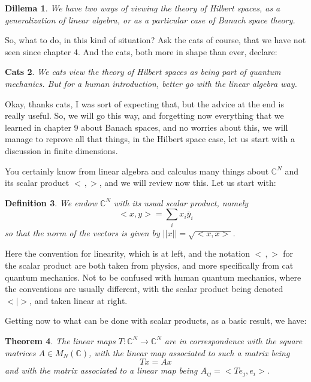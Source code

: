 \documentclass[12pt]{amsbook}
\newtheorem{theorem}{Theorem}[chapter]
\newtheorem{cats}[theorem]{Cats}
\newtheorem{definition}[theorem]{Definition}
\newtheorem{dillema}[theorem]{Dillema}
\begin{document}
\begin{dillema}
We have two ways of viewing the theory of Hilbert spaces, as a generalization of linear algebra, or as a particular case of Banach space theory.
\end{dillema}

So, what to do, in this kind of situation? Ask the cats of course, that we have not seen since chapter 4. And the cats, both more in shape than ever, declare:

\begin{cats}
We cats view the theory of Hilbert spaces as being part of quantum mechanics. But for a human introduction, better go with the linear algebra way.
\end{cats}

Okay, thanks cats, I was sort of expecting that, but the advice at the end is really useful. So, we will go this way, and forgetting now everything that we learned in chapter 9 about Banach spaces, and no worries about this, we will manage to reprove all that things, in the Hilbert space case, let us start with a discussion in finite dimensions. 

\bigskip

You certainly know from linear algebra and calculus many things about $\mathbb C^N$ and its scalar product $<\,,>$, and we will review now this. Let us start with:

\begin{definition}
We endow $\mathbb C^N$ with its usual scalar product, namely
$$<x,y>=\sum_ix_i\bar{y}_i$$
so that the norm of the vectors is given by $||x||=\sqrt{<x,x>}$.
\end{definition}

Here the convention for linearity, which is at left, and the notation $<\,,>$ for the scalar product are both taken from physics, and more specifically from cat quantum mechanics. Not to be confused with human quantum mechanics, where the conventions are usually different, with the scalar product being denoted $<|>$, and taken linear at right.

\bigskip

Getting now to what can be done with scalar products, as a basic result, we have:

\begin{theorem}
The linear maps $T:\mathbb C^N\to\mathbb C^N$ are in correspondence with the square matrices $A\in M_N(\mathbb C)$, with the linear map associated to such a matrix being
$$Tx=Ax$$
and with the matrix associated to a linear map being $A_{ij}=<Te_j,e_i>$.
\end{theorem}
\end{document}
